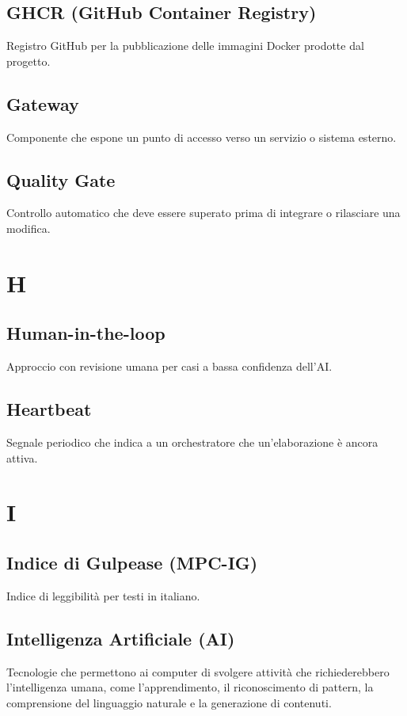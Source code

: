 \documentclass[a4paper,12pt]{article}
\begin{document}
\subsection{GHCR (GitHub Container Registry)}
Registro GitHub per la pubblicazione delle immagini Docker prodotte dal progetto.

\subsection{Gateway}
Componente che espone un punto di accesso verso un servizio o sistema esterno.

\subsection{Quality Gate}
Controllo automatico che deve essere superato prima di integrare o rilasciare una modifica.

\section{H}
\subsection{Human-in-the-loop}
Approccio con revisione umana per casi a bassa confidenza dell'AI.

\subsection{Heartbeat}
Segnale periodico che indica a un orchestratore che un'elaborazione è ancora attiva.

\section{I}
\subsection{Indice di Gulpease (MPC-IG)}
Indice di leggibilità per testi in italiano.

\subsection{Intelligenza Artificiale (AI)}
Tecnologie che permettono ai computer di svolgere attività che richiederebbero l'intelligenza umana, come l'apprendimento, il riconoscimento di pattern, la comprensione del linguaggio naturale e la generazione di contenuti.
\end{document}
